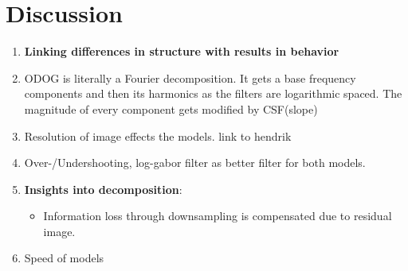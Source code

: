 

\newpage

\section{Discussion} 
\begin{enumerate}
    \item \textbf{Linking differences in structure with results in behavior}
    \item ODOG is literally a Fourier decomposition. It gets a base frequency components
    and then its harmonics as the filters are logarithmic spaced. The magnitude of every
    component gets modified by CSF(slope)
    \item Resolution of image effects the models. link to hendrik
    \item Over-/Undershooting, log-gabor filter as better filter for both models. 
    \item \textbf{Insights into decomposition}:
    \begin{itemize}
        \item Information loss through downsampling is compensated due to residual image.
    \end{itemize}
    \item Speed of models
\end{enumerate}

\newpage
\listoffigures

\newpage
\nocite{Adelson1996}
\nocite{Brainard2003-BRACCD-2}
\nocite{Hanson1978}
\nocite{Murray2021}
\nocite{Kingdom2014}
\nocite{Robinson2007}
\vspace*{1cm}
\begin{minipage}{1\textwidth}
\printbibliography
\end{minipage}



